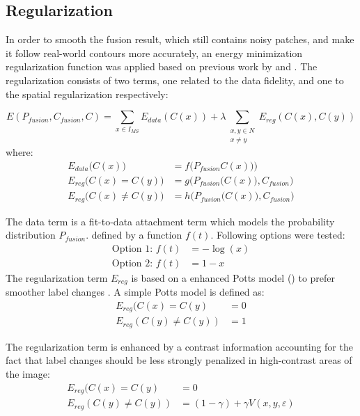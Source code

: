 \documentclass[10pt]{article}
\begin{document}
\subsection{Regularization}\label{sec:regularization}
In order to smooth the fusion result, which still contains noisy patches, and make it follow real-world contours more accurately, an energy minimization regularization function was applied based on previous work by \cite{hervieu_fusion_2016} and \cite{ouerghemmi_two-step_2017}. The regularization consists of two terms, one related to the data fidelity, and one to the spatial regularization respectively:

\begin{equation}
    E(P_{fusion},C_{fusion},C)=\sum_{x\in I_{MS}}E_{data}(C(x))+\lambda\sum _{\substack{x,y\in N\\x\neq y}}E_{reg}(C(x),C(y))
\end{equation}
where:
\begin{equation*}
    \begin{aligned}
    E_{data}\big(C(x)\big)&=f\Big(P_{fusion}C(x)\big)\Big)\\
    E_{reg}\big(C(x)=C(y)\big)&=g\Big(P_{fusion}\big(C(x)\big),C_{fusion}\Big)\\
    E_{reg}\big(C(x)\neq C(y)\big)&=h\Big(P_{fusion}\big(C(x)\big),C_{fusion}\Big)
    \end{aligned}
\end{equation*}
    
The data term is a fit-to-data attachment term which models the probability distribution $P_{fusion}$. defined by a function $f(t)$. Following options were tested:
\begin{align}
\text{Option 1: } f(t)&=-\log(x)\\
\text{Option 2: } f(t)&=1-x
\end{align}
The regularization term $E_{reg}$ is based on a enhanced Potts model (\cite{schindler_overview_2012}) to prefer smoother label changes . A simple Potts model is defined as:
\begin{equation}
    \begin{aligned}
        E_{reg}(C(x)=C(y)&=0\\ 
        E_{reg}(C(y)\neq C(y))&=1
    \end{aligned}    
\end{equation}

The regularization term is enhanced by a contrast information accounting for the fact that label changes should be less strongly penalized in high-contrast areas of the image:
\begin{equation}
    \begin{aligned}
        E_{reg}(C(x)=C(y)&=0\\ 
        E_{reg}(C(y)\neq C(y))&=(1-\gamma)+\gamma V(x,y,\varepsilon)
    \end{aligned}
\end{equation}
\end{document}
